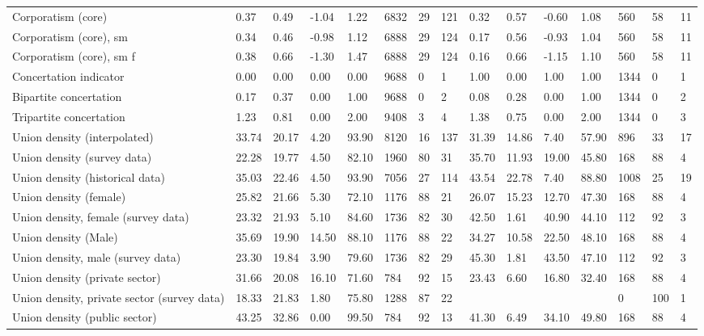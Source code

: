 \begin{longtable}{lllllllllllllll}
Corporatism (core) & 0.37 & 0.49 & -1.04 & 1.22 & 6832 & 29 & 121 & 0.32 & 0.57 & -0.60 & 1.08 & 560 & 58 & 11\\
\addlinespace
Corporatism (core), sm & 0.34 & 0.46 & -0.98 & 1.12 & 6888 & 29 & 124 & 0.17 & 0.56 & -0.93 & 1.04 & 560 & 58 & 11\\
Corporatism (core), sm f & 0.38 & 0.66 & -1.30 & 1.47 & 6888 & 29 & 124 & 0.16 & 0.66 & -1.15 & 1.10 & 560 & 58 & 11\\
Concertation indicator & 0.00 & 0.00 & 0.00 & 0.00 & 9688 & 0 & 1 & 1.00 & 0.00 & 1.00 & 1.00 & 1344 & 0 & 1\\
Bipartite concertation & 0.17 & 0.37 & 0.00 & 1.00 & 9688 & 0 & 2 & 0.08 & 0.28 & 0.00 & 1.00 & 1344 & 0 & 2\\
Tripartite concertation & 1.23 & 0.81 & 0.00 & 2.00 & 9408 & 3 & 4 & 1.38 & 0.75 & 0.00 & 2.00 & 1344 & 0 & 3\\
\addlinespace
Union density (interpolated) & 33.74 & 20.17 & 4.20 & 93.90 & 8120 & 16 & 137 & 31.39 & 14.86 & 7.40 & 57.90 & 896 & 33 & 17\\
Union density (survey data) & 22.28 & 19.77 & 4.50 & 82.10 & 1960 & 80 & 31 & 35.70 & 11.93 & 19.00 & 45.80 & 168 & 88 & 4\\
Union density (historical data) & 35.03 & 22.46 & 4.50 & 93.90 & 7056 & 27 & 114 & 43.54 & 22.78 & 7.40 & 88.80 & 1008 & 25 & 19\\
Union density (female) & 25.82 & 21.66 & 5.30 & 72.10 & 1176 & 88 & 21 & 26.07 & 15.23 & 12.70 & 47.30 & 168 & 88 & 4\\
Union density, female (survey data) & 23.32 & 21.93 & 5.10 & 84.60 & 1736 & 82 & 30 & 42.50 & 1.61 & 40.90 & 44.10 & 112 & 92 & 3\\
\addlinespace
Union density (Male) & 35.69 & 19.90 & 14.50 & 88.10 & 1176 & 88 & 22 & 34.27 & 10.58 & 22.50 & 48.10 & 168 & 88 & 4\\
Union density, male (survey data) & 23.30 & 19.84 & 3.90 & 79.60 & 1736 & 82 & 29 & 45.30 & 1.81 & 43.50 & 47.10 & 112 & 92 & 3\\
Union density (private sector) & 31.66 & 20.08 & 16.10 & 71.60 & 784 & 92 & 15 & 23.43 & 6.60 & 16.80 & 32.40 & 168 & 88 & 4\\
Union density, private sector (survey data) & 18.33 & 21.83 & 1.80 & 75.80 & 1288 & 87 & 22 &  &  &  &  & 0 & 100 & 1\\
Union density (public sector) & 43.25 & 32.86 & 0.00 & 99.50 & 784 & 92 & 13 & 41.30 & 6.49 & 34.10 & 49.80 & 168 & 88 & 4\\

\end{longtable}
